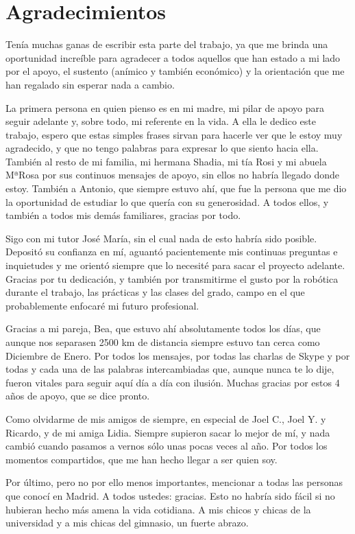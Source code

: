 \chapter*{Agradecimientos}
\setlength{\parskip}{1ex}

Tenía muchas ganas de escribir esta parte del trabajo, ya que me brinda una oportunidad increíble para agradecer a todos aquellos que han estado a mi lado por el apoyo, el sustento (anímico y también económico) y la orientación que me han regalado sin esperar nada a cambio.

La primera persona en quien pienso es en mi madre, mi pilar de apoyo para seguir adelante y, sobre todo, mi referente en la vida. A ella le dedico este trabajo, espero que estas simples frases sirvan para hacerle ver que le estoy muy agradecido, y que no tengo palabras para expresar lo que siento hacia ella. También al resto de mi familia, mi hermana Shadia, mi tía Rosi y mi abuela MªRosa por sus continuos mensajes de apoyo, sin ellos no habría llegado donde estoy. También a Antonio, que siempre estuvo ahí, que fue la persona que me dio la oportunidad de estudiar lo que quería con su generosidad. A todos ellos, y también a todos mis demás familiares, gracias por todo.

Sigo con mi tutor José María, sin el cual nada de esto habría sido posible. Depositó su confianza en mí, aguantó pacientemente mis continuas preguntas e inquietudes y me orientó siempre que lo necesité para sacar el proyecto adelante. Gracias por tu dedicación, y también por transmitirme el gusto por la robótica durante el trabajo, las prácticas y las clases del grado, campo en el que probablemente enfocaré mi futuro profesional.

Gracias a mi pareja, Bea, que estuvo ahí absolutamente todos los días, que aunque nos separasen 2500 km de distancia siempre estuvo tan cerca como Diciembre de Enero. Por todos los mensajes, por todas las charlas de Skype y por todas y cada una de las palabras intercambiadas que, aunque nunca te lo dije, fueron vitales para seguir aquí día a día con ilusión. Muchas gracias por estos 4 años de apoyo, que se dice pronto.

Como olvidarme de mis amigos de siempre, en especial de Joel C., Joel Y. y Ricardo, y de mi amiga Lidia. Siempre supieron sacar lo mejor de mí, y nada cambió cuando pasamos a vernos sólo unas pocas veces al año. Por todos los momentos compartidos, que me han hecho llegar a ser quien soy.

Por último, pero no por ello menos importantes, mencionar a todas las personas que conocí en Madrid. A todos ustedes: gracias. Esto no habría sido fácil si no hubieran hecho más amena la vida cotidiana. A mis chicos y chicas de la universidad y a mis chicas del gimnasio, un fuerte abrazo.
\restoregeometry